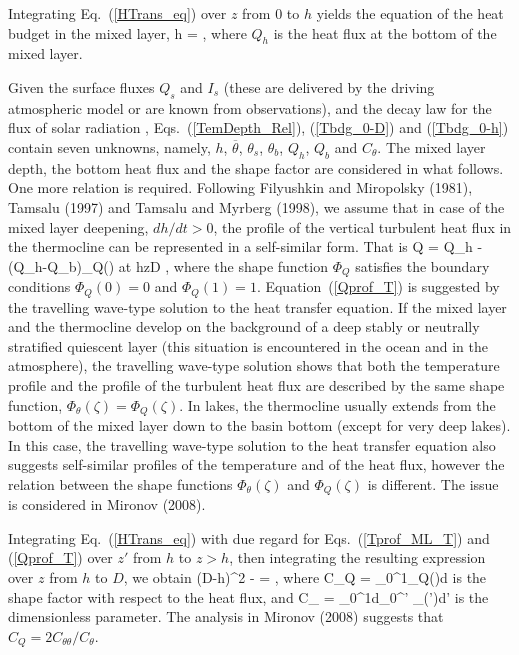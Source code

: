 Integrating Eq.~(\ref{HTrans_eq}) over $z$ from 0 to $h$
yields the equation of the heat budget in the mixed layer,
%
\beq\label{Tbdg_0-h}
h =
\left[ 
Q_s+I_s-Q_h-I(h) \right] , 
\eeq
%
where $Q_h$ is the heat flux at the bottom of the mixed layer. 

Given the surface fluxes $Q_s$ and $I_s$ 
(these are delivered by the driving atmospheric model 
or are known from observations), 
and the decay law for the flux of solar radiation
, 
Eqs.~(\ref{TemDepth_Rel}), (\ref{Tbdg_0-D}) and (\ref{Tbdg_0-h}) 
contain seven unknowns, namely, 
$h$, $\overline{\theta}$, $\theta_s$, $\theta_b$, $Q_h$, $Q_b$ and $C_{\theta}$.
The mixed layer depth, the bottom heat flux and the shape factor  
are considered in what follows. 
One more relation is required.
Following Filyushkin and Miropolsky (1981)\nocite{filyushkin1981}, 
Tamsalu \etal (1997)\nocite{tamsalu1997} and Tamsalu and Myrberg (1998)\nocite{tamsalu1998}, 
we assume that in case of the mixed layer deepening, $dh/dt>0$, 
the profile of the vertical turbulent heat flux in the thermocline 
can be represented in a self-similar form. That is  
%
\beq\label{Qprof_T}
Q = Q_h - (Q_h-Q_b)\Phi_Q(\zeta) 
\; \; \; \; \; \; \mbox{at}  \; \; h\leq z\leq D ,
\eeq
%
where the shape function $\Phi_Q$ satisfies 
the boundary conditions $\Phi_Q(0)=0$ and $\Phi_Q(1)=1$.
Equation~(\ref{Qprof_T}) is suggested by
the travelling wave-type solution to the heat transfer equation.
If the mixed layer and the thermocline develop on the background
of a deep stably or neutrally stratified quiescent layer 
(this situation is encountered in the ocean and in the atmosphere),
the travelling wave-type solution shows
that both the temperature profile and the profile of the turbulent
heat flux are described by the same shape function,
\ie $\Phi_{\theta}(\zeta)=\Phi_Q(\zeta)$. 
In lakes, the thermocline usually extends from the bottom of the mixed layer
down to the basin bottom (except for very deep lakes). In this case, 
the travelling wave-type solution to the heat transfer equation
also suggests self-similar profiles of the temperature and of the heat flux,
however the relation between the shape functions $\Phi_{\theta}(\zeta)$ and $\Phi_Q(\zeta)$
is different. The issue is considered in Mironov (2008)\nocite{mironov2008}.

Integrating Eq.~(\ref{HTrans_eq})
with due regard for Eqs.~(\ref{Tprof_ML_T}) and (\ref{Qprof_T})
over $z'$ from $h$ to $z>h$,
then integrating the resulting expression 
over $z$ from $h$ to $D$, we obtain 
%
\beqn
{}(D-h)^2 
-  =
\eeqn
%
\beq\label{Tb_dhdt_gt_0}
 ,
\eeq
%
where 
%
\beq\label{ShapeFac_Q} 
C_Q = \int_0^1\Phi_Q(\zeta)d\zeta   
\eeq
%
is the shape factor with respect to the heat flux, and
%
\beq\label{ShapeFac_T-2_def} 
C_{\theta\theta} = \int_0^1d\zeta\int_0^{\zeta'} \Phi_{\theta}(\zeta')d\zeta'   
\eeq
%
is the dimensionless parameter. 
The analysis in Mironov (2008) suggests that $C_Q=2C_{\theta\theta}/C_{\theta}$. 

